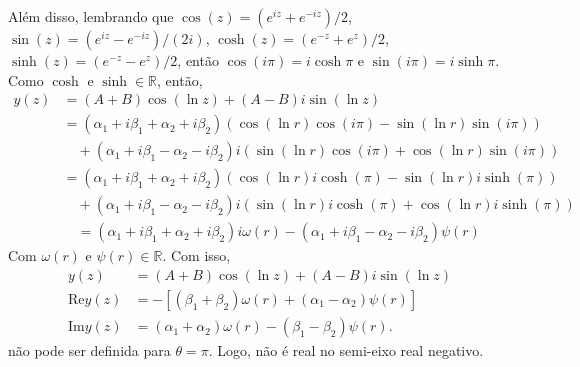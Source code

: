 \documentclass[a4paper,12pt, leqno, answers]{exam}
\begin{document}
\begin{questions}
\begin{solution}
        Al\'{e}m disso, lembrando que $\cos\left(z\right) = (e^{iz}+e^{-iz})/2$, $\sin\left(z\right) = (e^{iz}-e^{-iz})/(2i)$, $\cosh\left(z\right) = (e^{-z}+e^{z})/2$, $\sinh\left(z\right) = (e^{-z}-e^{z})/2$, ent\~{a}o $\cos\left(i \pi\right) = i\cosh \pi$ e $\sin\left(i \pi\right) = i\sinh \pi$. Como $\cosh$ e $\sinh \in \mathbb{R}$, ent\~{a}o,  
        \begin{align*}
            y(z) &= \left( A + B \right) \cos\left( \ln z \right) + \left( A - B \right) i \sin \left( \ln z \right) \\
            &= \left( \alpha_1 + i \beta_1 + \alpha_2 + i\beta_2 \right)\left( \cos\left(\ln r\right) \cos\left(i \pi\right) - \sin\left(\ln r\right) \sin\left(i \pi\right)\right) \\
            &\quad {}+ \left( \alpha_1 + i \beta_1 - \alpha_2 - i\beta_2 \right) i\left( \sin\left(\ln r\right) \cos\left(i \pi\right) + \cos\left(\ln r\right) \sin\left(i \pi \right)\right) \\
            &= \left( \alpha_1 + i \beta_1 + \alpha_2 + i\beta_2 \right)\left( \cos\left(\ln r\right) i\cosh\left(\pi\right) - \sin\left(\ln r\right) i\sinh\left(\pi\right)\right) \\
            &\quad {}+ \left( \alpha_1 + i \beta_1 - \alpha_2 - i\beta_2 \right) i\left( \sin\left(\ln r\right) i\cosh\left(\pi\right) + \cos\left(\ln r\right) i\sinh\left(\pi \right)\right) \\
            &\quad {}= \left( \alpha_1 + i \beta_1 + \alpha_2 + i\beta_2 \right)i \omega\left(r \right) - \left( \alpha_1 + i \beta_1 - \alpha_2 - i\beta_2 \right)  \psi\left(r \right)
        \end{align*}        
         Com $\omega\left(r\right) \text{ e } \psi\left(r\right) \in \mathbb{R}$. Com isso,
        \begin{align*}
             y\left( z \right) &= \left( A + B \right) \cos\left( \ln z \right) + \left( A - B \right) i \sin\left( \ln z \right) \\
             \text{Re}y\left( z \right) &= -\left[\left(\beta_1 + \beta_2 \right)\omega \left(r\right) + \left(\alpha_1 - \alpha_2\right)\psi \left(r\right)\right]\\
             \text{Im}y\left( z \right) &= \left(\alpha_1 + \alpha_2\right)\omega \left(r\right) - \left(\beta_1 - \beta_2\right)\psi \left(r\right).
        \end{align*}
        n\~{a}o pode ser definida para $\theta = \pi$. Logo, n\~{a}o \'{e} real no semi-eixo real negativo.
         

\end{solution}
\end{questions}
\end{document}
